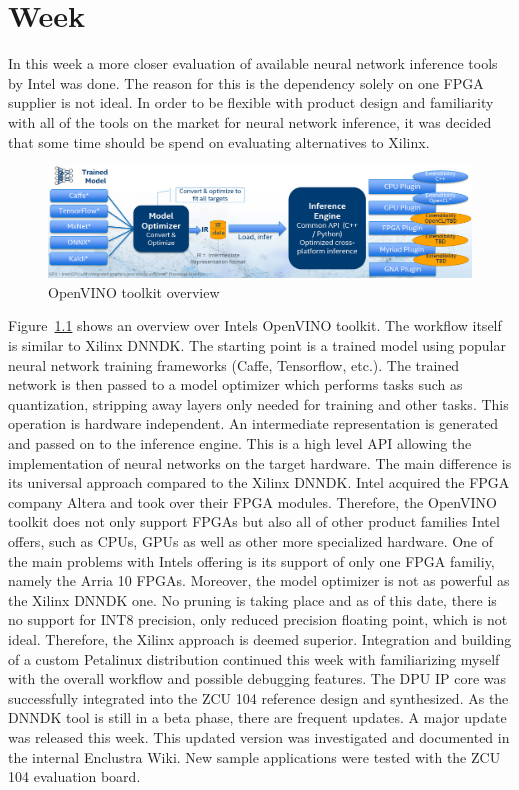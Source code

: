 \chapter{Week}
In this week a more closer evaluation of available neural network inference tools by Intel was done. The reason for this is the dependency solely on one \ac{FPGA} supplier is not ideal. In order to be flexible with product design and familiarity with all of the tools on the market for neural network inference, it was decided that some time should be spend on evaluating alternatives to Xilinx.
\begin{figure}[!htb]
	\centering
		\includegraphics[width=\textwidth]{bilder/openVINO-overview.png}
		\caption{OpenVINO toolkit overview~\cite{openvino}}
		\label{fig:openvino}
\end{figure}
Figure~\ref{fig:openvino} shows an overview over Intels OpenVINO toolkit. The workflow itself is similar to Xilinx \ac{DNNDK}. The starting point is a trained model using popular neural network training frameworks (Caffe, Tensorflow, etc.). The trained network is then passed to a model optimizer which performs tasks such as quantization, stripping away layers only needed for training and other tasks. This operation is hardware independent. An intermediate representation is generated and passed on to the inference engine. This is a high level \ac{API} allowing the implementation of neural networks on the target hardware. The main difference is its universal approach compared to the Xilinx \ac{DNNDK}. Intel acquired the \ac{FPGA} company Altera and took over their \ac{FPGA} modules. Therefore, the OpenVINO toolkit does not only support \acp{FPGA} but also all of other product families Intel offers, such as \acp{CPU}, \acp{GPU} as well as other more specialized hardware. One of the main problems with Intels offering is its support of only one \ac{FPGA} familiy, namely the Arria 10 \acp{FPGA}. Moreover, the model optimizer is not as powerful as the Xilinx \ac{DNNDK} one. No pruning is taking place and as of this date, there is no support for INT8 precision, only reduced precision floating point, which is not ideal. Therefore, the Xilinx approach is deemed superior.
Integration and building of a custom Petalinux distribution continued this week with familiarizing myself with the overall workflow and possible debugging features. The \ac{DPU} \ac{IP} core was successfully integrated into the ZCU 104 reference design and synthesized. As the \ac{DNNDK} tool is still in a beta phase, there are frequent updates. A major update was released this week. This updated version was investigated and documented in the internal Enclustra Wiki. New sample applications were tested with the ZCU 104 evaluation board.